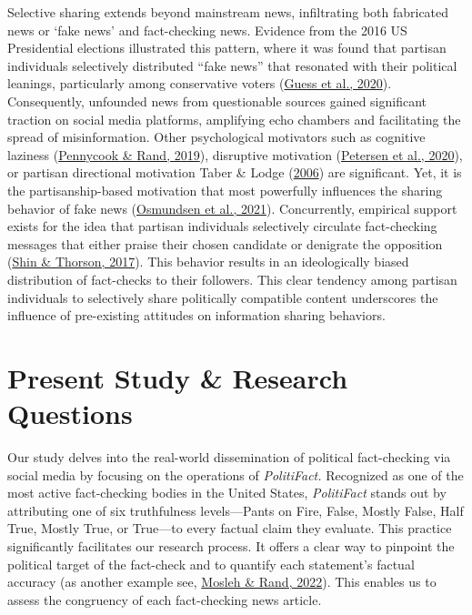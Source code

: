 \documentclass[
  12pt,
]{article}
\begin{document}
Selective sharing extends beyond mainstream news, infiltrating both
fabricated news or `fake news' and fact-checking news. Evidence from the
2016 US Presidential elections illustrated this pattern, where it was
found that partisan individuals selectively distributed ``fake news''
that resonated with their political leanings, particularly among
conservative voters (\protect\hyperlink{ref-guess2020exposure}{Guess et
al., 2020}). Consequently, unfounded news from questionable sources
gained significant traction on social media platforms, amplifying echo
chambers and facilitating the spread of misinformation. Other
psychological motivators such as cognitive laziness
(\protect\hyperlink{ref-pennycook2019lazy}{Pennycook \& Rand, 2019}),
disruptive motivation (\protect\hyperlink{ref-petersen2020need}{Petersen
et al., 2020}), or partisan directional motivation Taber \& Lodge
(\protect\hyperlink{ref-taber2006motivated}{2006}) are significant. Yet,
it is the partisanship-based motivation that most powerfully influences
the sharing behavior of fake news
(\protect\hyperlink{ref-osmundsen2021partisan}{Osmundsen et al., 2021}).
Concurrently, empirical support exists for the idea that partisan
individuals selectively circulate fact-checking messages that either
praise their chosen candidate or denigrate the opposition
(\protect\hyperlink{ref-shin2017partisan}{Shin \& Thorson, 2017}). This
behavior results in an ideologically biased distribution of fact-checks
to their followers. This clear tendency among partisan individuals to
selectively share politically compatible content underscores the
influence of pre-existing attitudes on information sharing behaviors.

\hypertarget{present-study-research-questions}{%
\section{Present Study \& Research
Questions}\label{present-study-research-questions}}

Our study delves into the real-world dissemination of political
fact-checking via social media by focusing on the operations of
\emph{PolitiFact.} Recognized as one of the most active fact-checking
bodies in the United States, \emph{PolitiFact} stands out by attributing
one of six truthfulness levels---Pants on Fire, False, Mostly False,
Half True, Mostly True, or True---to every factual claim they evaluate.
This practice significantly facilitates our research process. It offers
a clear way to pinpoint the political target of the fact-check and to
quantify each statement's factual accuracy (as another example see,
\protect\hyperlink{ref-mosleh2022measuring}{Mosleh \& Rand, 2022}). This
enables us to assess the congruency of each fact-checking news article.
\end{document}
